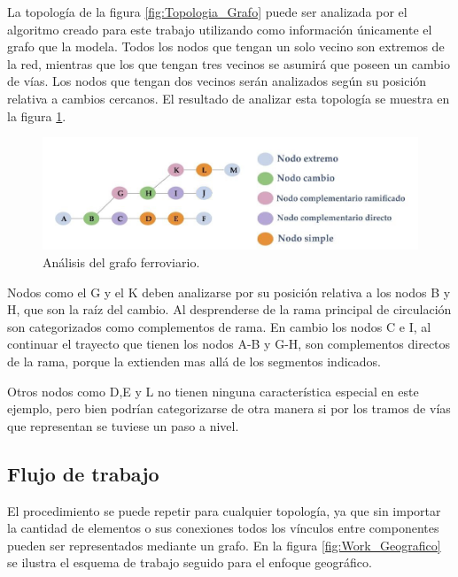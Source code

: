 		La topología de la figura \ref{fig:Topologia_Grafo} puede ser analizada por el algoritmo creado para este trabajo utilizando como información únicamente el grafo que la modela. Todos los nodos que tengan un solo vecino son extremos de la red, mientras que los que tengan tres vecinos se asumirá que poseen un cambio de vías. Los nodos que tengan dos vecinos serán analizados según su posición relativa a cambios cercanos. El resultado de analizar esta topología se muestra en la figura \ref{fig:Grafo_Analisis}.
	
		\begin{figure}[h]
		\centering
			\includegraphics[scale=.5]{./Figures/Grafo}
			\caption{Análisis del grafo ferroviario.}
			\label{fig:Grafo_Analisis}
		\end{figure}
	
		Nodos como el G y el K deben analizarse por su posición relativa a los nodos B y H, que son la raíz del cambio. Al desprenderse de la rama principal de circulación son categorizados como complementos de rama. En cambio los nodos C e I, al continuar el trayecto que tienen los nodos A-B y G-H, son complementos directos de la rama, porque la extienden mas allá de los segmentos indicados.
		
		Otros nodos como D,E y L no tienen ninguna característica especial en este ejemplo, pero bien podrían categorizarse de otra manera si por los tramos de vías que representan se tuviese un paso a nivel.
	
		\subsection{Flujo de trabajo}
		
		El procedimiento se puede repetir para cualquier topología, ya que sin importar la cantidad de elementos o sus conexiones todos los vínculos entre componentes pueden ser representados mediante un grafo. En la figura \ref{fig:Work_Geografico} se ilustra el esquema de trabajo seguido para el enfoque geográfico.	
		
